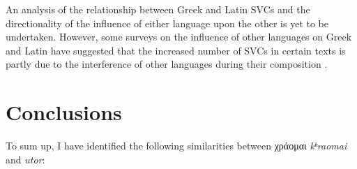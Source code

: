 \documentclass[output=paper,colorlinks,citecolor=brown]{langscibook}
\begin{document}
An analysis of the relationship between Greek and Latin SVCs and the directionality of the
influence of either language upon the other is yet to be undertaken. However, some surveys
on the influence of other languages on Greek and Latin have suggested that the increased
number of SVCs in certain texts is partly due to the interference of other languages
during their composition
\parencites{jimenez_lopez_colocaciones_2017,jimenez_lopez_colocaciones_2018,banos_arrepentirse_2017}.

\section{Conclusions}\label{sec:ma:8}

To sum up, I have identified the following similarities between χράομαι
\emph{kʰraomai} and \emph{utor}:
\end{document}
